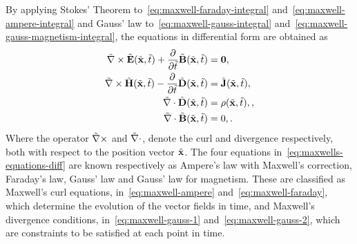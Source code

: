 By applying Stokes' Theorem to~\eqref{eq:maxwell-faraday-integral}
and~\eqref{eq:maxwell-ampere-integral} and Gauss' law
to~\eqref{eq:maxwell-gauss-integral}
and~\eqref{eq:maxwell-gauss-magnetism-integral}, the equations in differential
form are obtained as
\begin{subequations}
  \label{eq:maxwells-equations-diff}
  \begin{align}
    \tilde{\nabla} \times \tilde{\mathbf{E}}(\tilde{\mathbf{x}},\tilde{t}) + \frac{\partial}{\partial \tilde{t} } \tilde{\mathbf{B}}(\tilde{\mathbf{x}}, \tilde{t})&= \mathbf{0}, \label{eq:maxwell-faraday} \\
    \tilde{\nabla} \times \tilde{\mathbf{H}}(\tilde{\mathbf{x}},\tilde{t}) - \frac{\partial}{\partial \tilde{t} } \tilde{\mathbf{D}}(\tilde{\mathbf{x}}, \tilde{t})&= \tilde{\mathbf{J}}(\tilde{\mathbf{x}},\tilde{t}), \label{eq:maxwell-ampere} \\
    \tilde{\nabla} \cdot \tilde{\mathbf{D}} (\tilde{\mathbf{x}},\tilde{t}) &= \rho(\tilde{\mathbf{x}},\tilde{t}), \label{eq:maxwell-gauss-1}, \\
    \tilde{\nabla} \cdot \tilde{\mathbf{B}} (\tilde{\mathbf{x}},\tilde{t}) &= 0, \label{eq:maxwell-gauss-2} .
  \end{align}
\end{subequations}
Where the operator $\tilde{\nabla} \times$ and $\tilde{\nabla} \cdot$, denote the curl
and divergence respectively, both with respect to the
position vector $\tilde{\mathbf{x}}$. The four equations
in~\eqref{eq:maxwells-equations-diff} are known respectively as Ampere's law
with Maxwell's correction, Faraday's law, Gauss' law and Gauss' law for
magnetism. These are classified as Maxwell's curl
equations, in~\eqref{eq:maxwell-ampere} and~\eqref{eq:maxwell-faraday}, which
determine the evolution of the vector fields in time, and Maxwell's divergence
conditions, in~\eqref{eq:maxwell-gauss-1} and~\eqref{eq:maxwell-gauss-2}, which
are constraints to be satisfied at each point in time.

